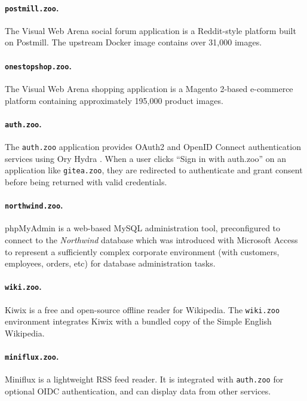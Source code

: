 \documentclass{article} %
\begin{document}
\paragraph{\texttt{postmill.zoo}.}
The Visual Web Arena \citep{visualwebarena} social forum application is a Reddit-style platform built on Postmill.
The upstream Docker image contains over 31,000 images.

\paragraph{\texttt{onestopshop.zoo}.}
The Visual Web Arena \citep{visualwebarena} shopping application is a Magento 2-based e-commerce platform containing approximately 195,000 product images.

\paragraph{\texttt{auth.zoo}.}
The \texttt{auth.zoo} application provides OAuth2 and OpenID Connect authentication services using Ory Hydra \citep{oryhydra}.
When a user clicks ``Sign in with auth.zoo'' on an application like \texttt{gitea.zoo}, they are redirected to authenticate and grant consent before being returned with valid credentials.

\paragraph{\texttt{northwind.zoo}.}
phpMyAdmin \citep{phpmyadmin} is a web-based MySQL administration tool, preconfigured to connect to the \textit{Northwind} database which was introduced with Microsoft Access \citep{northwind_microsoft} to represent a sufficiently complex corporate environment (with customers, employees, orders, etc) for database administration tasks.

\paragraph{\texttt{wiki.zoo}.}
Kiwix \citep{kiwix} is a free and open-source offline reader for Wikipedia.
The \texttt{wiki.zoo} environment integrates Kiwix with a bundled copy of the Simple English Wikipedia.

\paragraph{\texttt{miniflux.zoo}.}
Miniflux \citep{miniflux} is a lightweight RSS feed reader.
It is integrated with \texttt{auth.zoo} for optional OIDC authentication, and can display data from other services.
\end{document}

